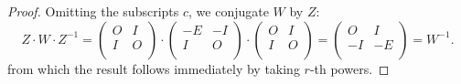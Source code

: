 \begin{proof}
  Omitting the subscripts $c$, we conjugate $W$ by
  $Z$:
  \[
  Z \cdot W \cdot Z^{-1}
  =
	  \left(\begin{matrix}
		  O & I \\ I & O\\
	  \end{matrix}\right)
	  \cdot
	  \left(\begin{matrix}
		  -E & -I \\ I & O\\
	  \end{matrix}\right)
	  \cdot
	  \left(\begin{matrix}
		  O & I \\ I & O\\
	  \end{matrix}\right)
	  =
	  \left(\begin{matrix}
		  O & I \\ -I & -E\\
	  \end{matrix}\right)
	  = W^{-1}.
  \]
from which the result follows immediately by taking $r$-th powers.
\end{proof}

